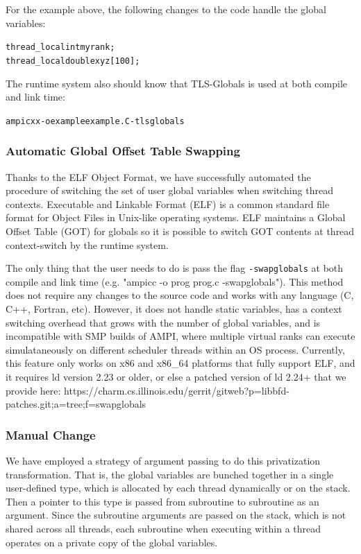 \documentclass[10pt]{article}
\begin{document}
For the example above, the following changes to the code handle the global variables:
\begin{alltt}
thread_local int myrank;
thread_local double xyz[100];
\end{alltt}

The runtime system also should know that TLS-Globals is used at both compile and link time:

\begin{alltt}
ampicxx -o example example.C -tlsglobals
\end{alltt}

\subsubsection{Automatic Global Offset Table Swapping}
Thanks to the ELF Object Format, we have successfully automated the procedure 
of switching the set of user global variables when switching thread contexts.
Executable and Linkable Format (ELF) is a common standard file format 
for Object Files in Unix-like operating systems.
ELF maintains a Global Offset Table (GOT) for globals so it is possible to
switch GOT contents at thread context-switch by the runtime system.

The only thing that the user needs to do is pass the flag {\tt -swapglobals}
at both compile and link time (e.g. "ampicc -o prog prog.c -swapglobals"). This method does not require
any changes to the source code and works with any language (C, C++, Fortran, etc).
However, it does not handle static variables, has a context switching
overhead that grows with the number of global variables, and is incompatible with SMP builds
of AMPI, where multiple virtual ranks can execute simulataneously on different scheduler threads
within an OS process.
Currently, this feature only works on x86 and x86\_64 platforms that fully support ELF,
and it requires ld version 2.23 or older, or else a patched version of ld 2.24+ that we provide
here: https://charm.cs.illinois.edu/gerrit/gitweb?p=libbfd-patches.git;a=tree;f=swapglobals

\subsubsection{Manual Change}
We have employed a strategy of argument passing to do this privatization
transformation. That is, the global variables are bunched together in a
single user-defined type, which is allocated by each thread dynamically or on the stack.
Then a pointer to this type is passed from subroutine to subroutine as an argument.
Since the subroutine arguments are passed on the stack, which is not shared
across all threads, each subroutine when executing within a thread operates on
a private copy of the global variables. 
\end{document}
